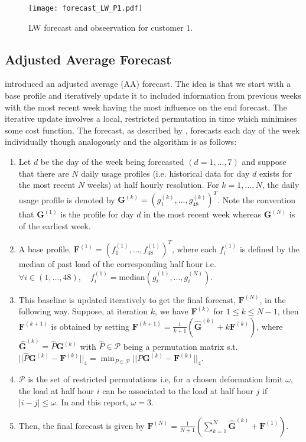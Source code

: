\begin{figure}
\texttt{[image: forecast\_LW\_P1.pdf]}
\caption{LW forecast and obseervation for customer 1.}
\label{fig:LW_forecast_P1} 
\end{figure}

\subsection{Adjusted Average Forecast}

\cite{dan14} introduced an adjusted average (AA) forecast. The idea is that we start with a base profile and iteratively update it to included information from previous weeks with the most recent week having the most influence on the end forecast. The iterative update involves a local, restricted permutation in time which minimises some cost function. The forecast, as described by \cite{dan14}, forecasts each day of the week individually though analogously and the algorithm is as follows:
\begin{enumerate}[label=\roman*)]
\item Let $d$ be the day of the week being forecasted $(d=1,...,7)$ and suppose that there are $N$ daily usage profiles (i.e. historical data for day $d$ exists for the most recent $N$ weeks) at half hourly resolution. For $k = 1, ..., N$, the daily usage profile is denoted by $\boldsymbol{G}^{(k)} = (g_1^{(k)}, ... , g_{48}^{(k)})^T$. Note the convention that $\boldsymbol{G}^{(1)}$ is the profile for day $d$ in the most recent week whereas $\boldsymbol{G}^{(N)}$ is of the earliest week.
\item A base profile, $\boldsymbol{F}^{(1)} = \left(f_1^{(1)}, ... , f_{48}^{(1)} \right)^T$, where each $f_i^{(1)}$ is defined by the median of past load of the corresponding half hour i.e. $ \forall i \in (1, ..., 48), \quad f_i^{(1)} = \text{median}(g_i^{(1)}, ..., g_i^{(N)})$.
\item This baseline is updated iteratively to get the final forecast, $\boldsymbol{F}^{(N)}$, in the following way. Suppose, at iteration $k$, we have $\boldsymbol{F}^{(k)}$ for $1 \le k \le N-1$, then $\boldsymbol{F}^{(k+1)}$ is obtained by setting $\boldsymbol{F}^{(k+1)} = \frac{1}{k+1} \left( \boldsymbol{\hat{G}}^{(k)} + k \boldsymbol{F}^{(k)}\right)$, where $\boldsymbol{\hat{G}}^{(k)} = \hat{P}\boldsymbol{G}^{(k)}$ with $\hat{P} \in  \mathscr{P}$ being a permutation matrix s.t. $||\hat{P}\boldsymbol{G}^{(k)} - \boldsymbol{F}^{(k)}||_4 = \displaystyle \min_{P \in \mathscr{P}}||P\boldsymbol{G}^{(k)} - \boldsymbol{F}^{(k)}||_4 $.
\item $\mathscr{P}$ is the set of restricted permutations i.e, for a chosen deformation limit $\omega$, the load at half hour $i$ can be associated to the load at half hour $j$ if $|i-j| \le \omega$. In \cite{dan14} and this report, $\omega=3$.
\item Then, the final forecast is given by $\boldsymbol{F}^{(N)} = \frac{1}{N+1}\left(\displaystyle \sum_{k=1}^N \boldsymbol{\hat{G}}^{(k)} + \boldsymbol{F}^{(1)} \right)$.
\end{enumerate}

